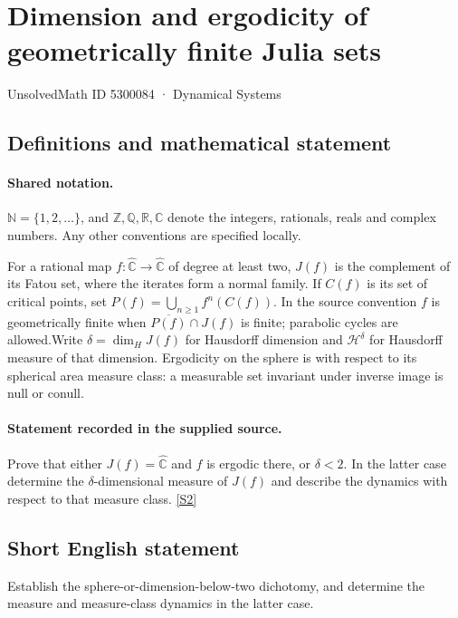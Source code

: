 \documentclass[11pt]{article}
\newcommand{\sref}[2]{\hyperlink{source:#1:#2}{[S#2]}}
\begin{document}
\setcounter{section}{5300083}
\section{Dimension and ergodicity of geometrically finite Julia sets}\label{5300084}
{\small\sffamily UnsolvedMath ID 5300084 · Dynamical Systems}
\subsection{Definitions and mathematical statement}

\paragraph{Shared notation.}$\mathbb N=\{1,2,\ldots\}$, and $\mathbb Z,\mathbb Q,\mathbb R,\mathbb C$ denote the integers, rationals, reals and complex numbers. Any other conventions are specified locally.


For a rational map $f:\widehat{\mathbb C}\to\widehat{\mathbb C}$ of degree at least two, $J(f)$ is the complement of its Fatou set, where the iterates form a normal family. If $C(f)$ is its set of critical points, set $P(f)=\bigcup_{n\geq1}f^n(C(f))$. In the source convention $f$ is geometrically finite when $\overline{P(f)}\cap J(f)$ is finite; parabolic cycles are allowed.Write $\delta=\dim_H J(f)$ for Hausdorff dimension and $\mathcal H^\delta$ for Hausdorff measure of that dimension. Ergodicity on the sphere is with respect to its spherical area measure class: a measurable set invariant under inverse image is null or conull.
\paragraph{Statement recorded in the supplied source.}
Prove that either $J(f)=\widehat{\mathbb C}$ and $f$ is ergodic there, or $\delta<2$. In the latter case determine the $\delta$-dimensional measure of $J(f)$ and describe the dynamics with respect to that measure class. \sref{5300084}{2}
\subsection{Short English statement}
Establish the sphere-or-dimension-below-two dichotomy, and determine the measure and measure-class dynamics in the latter case.
\end{document}
